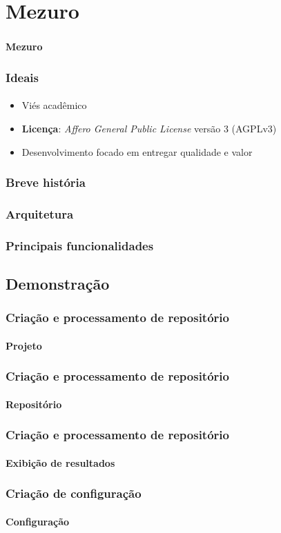 \documentclass{beamer}
\begin{document}
\section{Mezuro}
\begin{frame}
  \frametitle{}
  \framesubtitle{}

  \LARGE{\textbf{Mezuro}}
\end{frame}

\begin{frame}
  \frametitle{Ideais}
  \framesubtitle{}

  \begin{itemize}
    \item Viés acadêmico
    \item \textbf{Licença}: \textit{Affero General Public License} versão 3 (AGPLv3)
    \item Desenvolvimento focado em entregar qualidade e valor
  \end{itemize}
\end{frame}

\begin{frame}
  \frametitle{Breve história}
  \framesubtitle{}
\end{frame}

\begin{frame}
  \frametitle{Arquitetura}
  \framesubtitle{}
\end{frame}

\begin{frame}
  \frametitle{Principais funcionalidades}
  \framesubtitle{}
\end{frame}

  \subsection{Demonstração}
  \begin{frame}
    \frametitle{Criação e processamento de repositório}
    \framesubtitle{Projeto}
  \end{frame}

  \begin{frame}
    \frametitle{Criação e processamento de repositório}
    \framesubtitle{Repositório}
  \end{frame}

  \begin{frame}
    \frametitle{Criação e processamento de repositório}
    \framesubtitle{Exibição de resultados}
  \end{frame}

  \begin{frame}
    \frametitle{Criação de configuração}
    \framesubtitle{Configuração}
  \end{frame}
\end{document}
